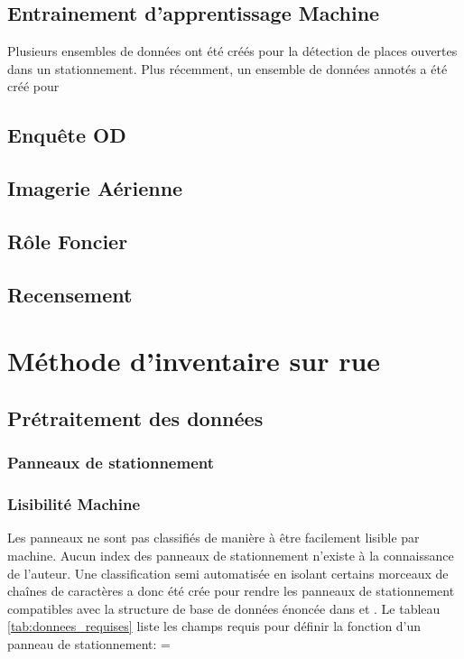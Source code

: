   \subsection{Entrainement d'apprentissage Machine}
    Plusieurs ensembles de données ont été créés pour la détection de places ouvertes dans un stationnement. Plus récemment, un ensemble de données annotés a été créé pour 
  \subsection{Enquête OD}
  \subsection{Imagerie Aérienne}
  \subsection{Rôle Foncier}
  \subsection{Recensement}
  
\section{Méthode d'inventaire sur rue}
  \subsection{Prétraitement des données}
    \subsubsection{Panneaux de stationnement}
      \subsubsection{Lisibilité Machine}
        Les panneaux ne sont pas classifiés de manière à être facilement lisible par machine. Aucun index des panneaux de stationnement n'existe à la connaissance de l'auteur. Une classification semi automatisée en isolant certains morceaux de chaînes de caractères a donc été crée pour rendre les panneaux de stationnement compatibles avec la structure de base de données énoncée dans \textcite{Bourdeau:MethodologieAnalyse:2014} et \textcite{Morency:DeveloppementMise:2022}. Le tableau \ref{tab:donnees_requises} liste les champs requis pour définir la fonction d'un panneau de stationnement:
        \LTcapwidth=\textwidth


